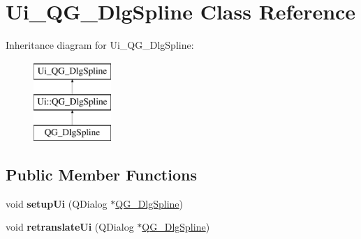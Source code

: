 \hypertarget{classUi__QG__DlgSpline}{\section{Ui\-\_\-\-Q\-G\-\_\-\-Dlg\-Spline Class Reference}
\label{classUi__QG__DlgSpline}
}
Inheritance diagram for Ui\-\_\-\-Q\-G\-\_\-\-Dlg\-Spline\-:\begin{figure}[H]
\begin{center}
\leavevmode
\includegraphics[height=3.000000cm]{classUi__QG__DlgSpline}
\end{center}
\end{figure}
\subsection*{Public Member Functions}
\begin{DoxyCompactItemize}
\item 
\hypertarget{classUi__QG__DlgSpline_a7ddf62ae71bfd24e7bd8d31a4986ea68}{void {\bfseries setup\-Ui} (Q\-Dialog $\ast$\hyperlink{classQG__DlgSpline}{Q\-G\-\_\-\-Dlg\-Spline})}\label{classUi__QG__DlgSpline_a7ddf62ae71bfd24e7bd8d31a4986ea68}

\item 
\hypertarget{classUi__QG__DlgSpline_a49e621558cfd91ad1b589f90e4cf5258}{void {\bfseries retranslate\-Ui} (Q\-Dialog $\ast$\hyperlink{classQG__DlgSpline}{Q\-G\-\_\-\-Dlg\-Spline})}\label{classUi__QG__DlgSpline_a49e621558cfd91ad1b589f90e4cf5258}

\end{DoxyCompactItemize}
